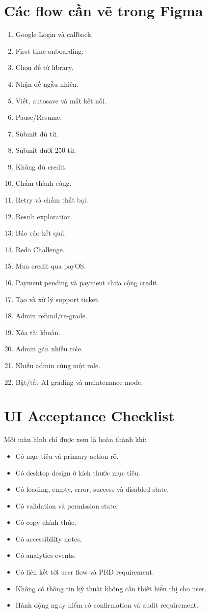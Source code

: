 \documentclass[11pt,a4paper]{article}
\begin{document}
\section{Các flow cần vẽ trong Figma}
\begin{enumerate}
  \item Google Login và callback.
  \item First-time onboarding.
  \item Chọn đề từ library.
  \item Nhận đề ngẫu nhiên.
  \item Viết, autosave và mất kết nối.
  \item Pause/Resume.
  \item Submit đủ từ.
  \item Submit dưới 250 từ.
  \item Không đủ credit.
  \item Chấm thành công.
  \item Retry và chấm thất bại.
  \item Result exploration.
  \item Báo cáo kết quả.
  \item Redo Challenge.
  \item Mua credit qua payOS.
  \item Payment pending và payment chưa cộng credit.
  \item Tạo và xử lý support ticket.
  \item Admin refund/re-grade.
  \item Xóa tài khoản.
  \item Admin gán nhiều role.
  \item Nhiều admin cùng một role.
  \item Bật/tắt AI grading và maintenance mode.
\end{enumerate}

\section{UI Acceptance Checklist}
Mỗi màn hình chỉ được xem là hoàn thành khi:
\begin{itemize}
  \item Có mục tiêu và primary action rõ.
  \item Có desktop design ở kích thước mục tiêu.
  \item Có loading, empty, error, success và disabled state.
  \item Có validation và permission state.
  \item Có copy chính thức.
  \item Có accessibility notes.
  \item Có analytics events.
  \item Có liên kết tới user flow và PRD requirement.
  \item Không có thông tin kỹ thuật không cần thiết hiển thị cho user.
  \item Hành động nguy hiểm có confirmation và audit requirement.
\end{itemize}
\end{document}
